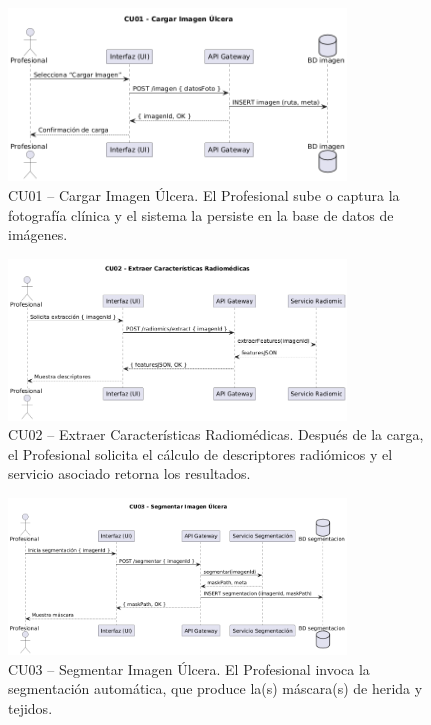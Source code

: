 \begin{figure}[H]
  \centering
  \includegraphics[width=0.8\textwidth]{imagenes/cu01_seq.png}
  \caption{CU01 – Cargar Imagen Úlcera. El Profesional sube o captura la fotografía clínica y el sistema la persiste en la base de datos de imágenes.}
  \label{fig:cu01_seq}
\end{figure}

\begin{figure}[H]
  \centering
  \includegraphics[width=0.8\textwidth]{imagenes/cu02_seq.png}
  \caption{CU02 – Extraer Características Radiomédicas. Después de la carga, el Profesional solicita el cálculo de descriptores radiómicos y el servicio asociado retorna los resultados.}
  \label{fig:cu02_seq}
\end{figure}

\begin{figure}[H]
  \centering
  \includegraphics[width=0.8\textwidth]{imagenes/cu03_seq.png}
  \caption{CU03 – Segmentar Imagen Úlcera. El Profesional invoca la segmentación automática, que produce la(s) máscara(s) de herida y tejidos.}
  \label{fig:cu03_seq}
\end{figure}

